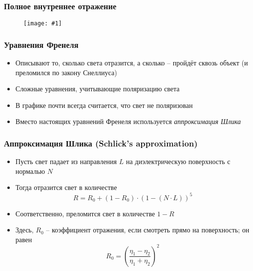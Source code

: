 \documentclass[10pt]{beamer}
\newcommand{\slideimage}[1]{
  \begin{figure}
    \begin{adjustbox}{width=\textwidth, totalheight=\textheight-2\baselineskip-2\baselineskip,keepaspectratio}
      \texttt{[image: \#1]}
    \end{adjustbox}
  \end{figure}
}
\begin{document}
\begin{frame}[fragile]
\frametitle{Полное внутреннее отражение}
\slideimage{turtle.jpg}
\end{frame}

\begin{frame}
\frametitle{Уравнения Френеля}
\begin{itemize}
\item Описывают то, сколько света отразится, а сколько -- пройдёт сквозь объект (и преломился по закону Снеллиуса)
\pause
\item Сложные уравнения, учитывающие поляризацию света
\pause
\item В графике почти всегда считается, что свет не поляризован
\pause
\item Вместо настоящих уравнений Френеля используется \textit{аппроксимация Шлика}
\end{itemize}
\end{frame}

\begin{frame}
\frametitle{Аппроксимация Шлика (Schlick's approximation)}
\begin{itemize}
\item Пусть свет падает из направления \begin{math}L\end{math} на диэлектрическую поверхность с нормалью \begin{math}N\end{math}
\pause
\item Тогда отразится свет в количестве
\begin{equation*}
R = R_0 + (1 - R_0) \cdot (1 - (N \cdot L))^5
\end{equation*}
\pause
\item Соответственно, преломится свет в количестве \begin{math}1-R\end{math}
\pause
\item Здесь, \begin{math}R_0\end{math} -- коэффициент отражения, если смотреть прямо на поверхность; он равен
\begin{equation*}
R_0 = \left(\frac{\eta_1-\eta_2}{\eta_1+\eta_2}\right)^2
\end{equation*}
\end{itemize}
\end{frame}
\end{document}
